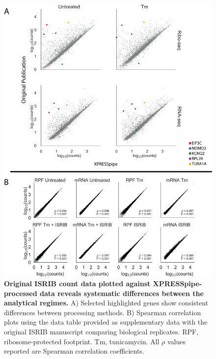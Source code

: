 \documentclass[10pt, oneside]{article}
\begin{document}
\begin{figure}
\centering
  \includegraphics[width=160mm]{figures/xpresspipe_supplement4.png}
  \caption{\textbf{Original ISRIB count data plotted against XPRESSpipe-processed data reveals systematic differences between the analytical regimes.} A) Selected highlighted genes show consistent differences between processing methods. B) Spearman correlation plots using the data table provided as supplementary data with the original ISRIB manuscript comparing biological replicates. RPF, ribosome-protected footprint. Tm, tunicamycin. All $\rho$ values reported are Spearman correlation coefficients.}
  \label{fig:supplement4}
\end{figure}
\end{document}

